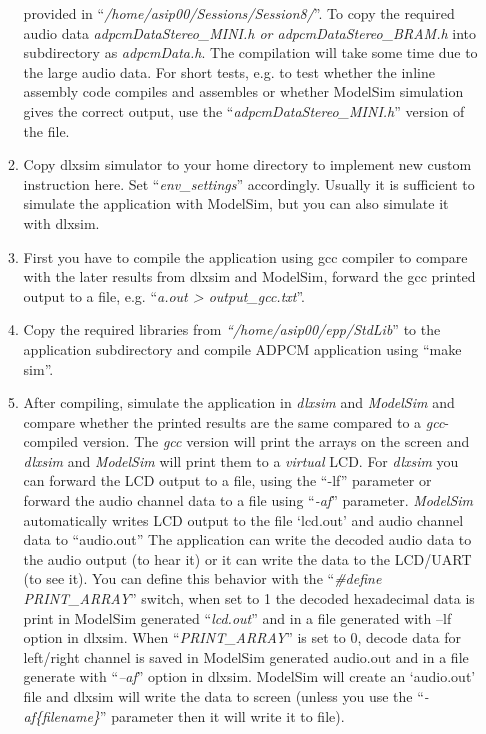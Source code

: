 \begin{enumerate}
\begin{enumerate}
		provided in ``\emph{/home/asip00/Sessions/Session8/}''. To copy the
		required audio data \emph{adpcmDataStereo\_MINI.h or
			adpcmDataStereo\_BRAM.h} into subdirectory as \emph{adpcmData.h}.
		The compilation will take some time due to the large audio data. For
		short tests, e.g. to test whether the inline assembly code compiles
		and assembles or whether ModelSim simulation gives the correct
		output, use the ``\emph{adpcmDataStereo\_MINI.h}'' version of the
		file.
		\item
		Copy dlxsim simulator to your home directory to implement new custom
		instruction here. Set ``\emph{env\_settings}'' accordingly. Usually
		it is sufficient to simulate the application with ModelSim, but you
		can also simulate it with dlxsim.
		\item
		First you have to compile the application using gcc compiler to
		compare with the later results from dlxsim and ModelSim, forward the
		gcc printed output to a file, e.g. ``\emph{a.out \textgreater{}
			output\_gcc.txt}''.
		\item
		Copy the required libraries from \emph{``/home/asip00/epp/StdLib}''
		to the application subdirectory and compile ADPCM application using
		``make sim''.
		\item
		After compiling, simulate the application in \emph{dlxsim} and
		\emph{ModelSim} and compare whether the printed results are the same
		compared to a \emph{gcc}-compiled version. The \emph{gcc} version
		will print the arrays on the screen and \emph{dlxsim} and
		\emph{ModelSim} will print them to a \emph{virtual} LCD. For
		\emph{dlxsim} you can forward the LCD output to a file, using the
		``-lf'' parameter or forward the audio channel data to a file using
		``\emph{-af}'' parameter. \emph{ModelSim} automatically writes LCD
		output to the file `lcd.out' and audio channel data to ``audio.out''
		The application can write the decoded audio data to the audio output
		(to hear it) or it can write the data to the LCD/UART (to see it).
		You can define this behavior with the ``\emph{\#define
			PRINT\_ARRAY}'' switch, when set to 1 the decoded hexadecimal data
		is print in ModelSim generated ``\emph{lcd.out}'' and in a file
		generated with --lf option in dlxsim. When ``\emph{PRINT\_ARRAY}''
		is set to 0, decode data for left/right channel is saved in ModelSim
		generated audio.out and in a file generate with ``\emph{--af}''
		option in dlxsim. ModelSim will create an `audio.out' file and
		dlxsim will write the data to screen (unless you use the
		``\emph{-af\{filename\}}'' parameter then it will write it to file).

\end{enumerate}
\end{enumerate}
